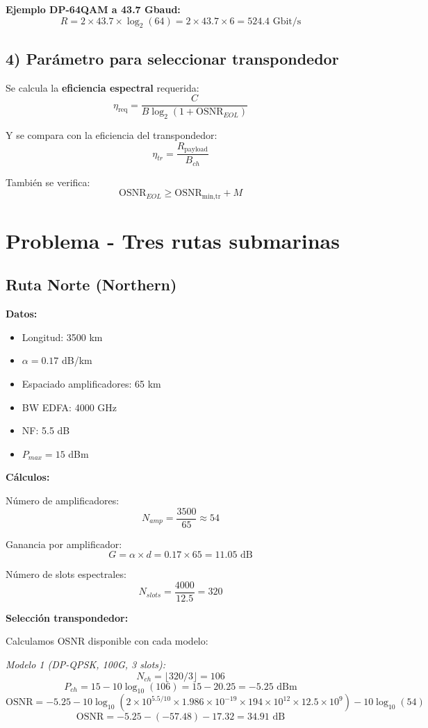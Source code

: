 \documentclass[a4paper,11pt]{article}
\begin{document}
\textbf{Ejemplo DP-64QAM a 43.7 Gbaud:}
$$R = 2 \times 43.7 \times \log_2(64) = 2 \times 43.7 \times 6 = 524.4 \text{ Gbit/s}$$

\subsection*{4) Parámetro para seleccionar transpondedor}

Se calcula la \textbf{eficiencia espectral} requerida:
$$\eta_{\text{req}} = \frac{C}{B \log_2(1 + \text{OSNR}_{EOL})}$$

Y se compara con la eficiencia del transpondedor:
$$\eta_{tr} = \frac{R_{\text{payload}}}{B_{ch}}$$

También se verifica:
$$\text{OSNR}_{EOL} \geq \text{OSNR}_{\text{min,tr}} + M$$

\section*{Problema - Tres rutas submarinas}

\subsection*{Ruta Norte (Northern)}
\textbf{Datos:}
\begin{itemize}
    \item Longitud: 3500 km
    \item $\alpha = 0.17$ dB/km
    \item Espaciado amplificadores: 65 km
    \item BW EDFA: 4000 GHz
    \item NF: 5.5 dB
    \item $P_{max} = 15$ dBm
\end{itemize}

\textbf{Cálculos:}

Número de amplificadores:
$$N_{amp} = \frac{3500}{65} \approx 54$$

Ganancia por amplificador:
$$G = \alpha \times d = 0.17 \times 65 = 11.05 \text{ dB}$$

Número de slots espectrales:
$$N_{slots} = \frac{4000}{12.5} = 320$$

\textbf{Selección transpondedor:}

Calculamos OSNR disponible con cada modelo:

\textit{Modelo 1 (DP-QPSK, 100G, 3 slots):}
$$N_{ch} = \lfloor 320/3 \rfloor = 106$$
$$P_{ch} = 15 - 10\log_{10}(106) = 15 - 20.25 = -5.25 \text{ dBm}$$
$$\text{OSNR} = -5.25 - 10\log_{10}(2 \times 10^{5.5/10} \times 1.986 \times 10^{-19} \times 194 \times 10^{12} \times 12.5 \times 10^9) - 10\log_{10}(54)$$
$$\text{OSNR} = -5.25 - (-57.48) - 17.32 = 34.91 \text{ dB}$$
\end{document}
